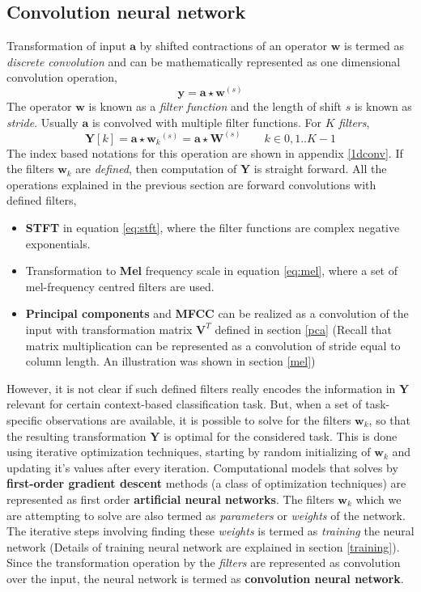 \subsection{Convolution neural network}
\label{stacked}
Transformation of input $\textbf{a}$ by shifted contractions of an operator $\textbf{w}$ is termed as \textit{discrete convolution} and can be mathematically represented as one dimensional convolution operation, 
\[
	\textbf{y} = \textbf{a} \star \textbf{w}^{(s)}
\]   
The operator $\textbf{w}$ is known as a \textit{filter function} and the length of shift $s$ is known as \textit{stride}. Usually $\textbf{a}$ is convolved with multiple filter functions. For $K$ \textit{filters},
\[
	\textbf{Y}[k] = \textbf{a} \star {\textbf{w}_{k}}^{(s)} = \textbf{a} \star \textbf{W}^{(s)} \qquad k \in {0,1..K-1}
\] 
The index based notations for this operation are shown in appendix \ref{1dconv}. If the filters $\textbf{w}_{k}$ are \textit{defined}, then computation of $\textbf{Y}$ is straight forward. All the operations explained in the previous section are forward convolutions with defined filters,
\begin{itemize}
\setlength\itemsep{0em}

\item \textbf{STFT} in equation \ref{eq:stft}, where the filter functions are complex negative exponentials.
\item Transformation to \textbf{Mel} frequency scale in equation \ref{eq:mel}, where a set of mel-frequency centred filters are used.
\item \textbf{Principal components} and \textbf{MFCC} can be realized as a convolution of the input with transformation matrix $\textbf{V}^{T}$ defined in section \ref{pca} (Recall that matrix multiplication can be represented as a convolution of stride equal to column length. An illustration was shown in section \ref{mel})  

\end{itemize}
However, it is not clear if such defined filters really encodes the information in $\textbf{Y}$ relevant for certain context-based classification task. But, when a set of task-specific observations are available, it is possible to solve for the filters $\textbf{w}_{k}$, so that the resulting transformation $\textbf{Y}$ is optimal for the considered task. This is done using iterative optimization techniques, starting by random initializing of $\textbf{w}_{k}$ and updating it's values after every iteration. Computational models that solves by \textbf{first-order gradient descent} methods (a class of optimization techniques) are represented as first order \textbf{artificial neural networks}. The filters $\textbf{w}_{k}$ which we are attempting to solve are also termed as \textit{parameters} or \textit{weights} of the network. The iterative steps involving finding these \textit{weights} is termed as \textit{training} the neural network (Details of training neural network are explained in section \ref{training}). Since the transformation operation by the \textit{filters} are represented as convolution over the input, the neural network is termed as \textbf{convolution neural network}.   

